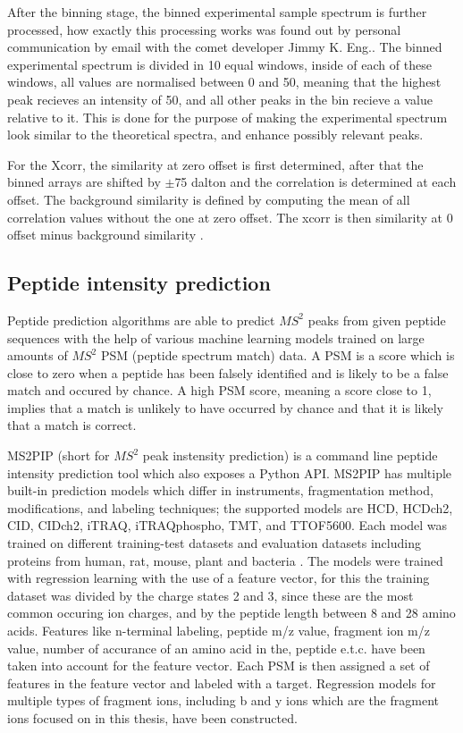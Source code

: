\documentclass[11pt]{article}
\begin{document}
After the binning stage, the binned experimental sample spectrum is further processed, how exactly this processing works was found out by personal communication by email with the comet developer Jimmy K. Eng.. The binned experimental spectrum is divided in 10 equal windows, inside of each of these windows, all values are normalised between 0 and 50, meaning that the highest peak recieves an intensity of 50, and all other peaks in the bin recieve a value relative to it. This is done for the purpose of making the experimental spectrum look similar to the theoretical spectra, and enhance possibly relevant peaks.

For the Xcorr, the similarity at zero offset is first determined, after that the binned arrays are shifted by $\pm$75 dalton and the correlation is determined at each offset. The background similarity is defined by computing the mean of all correlation values without the one at zero offset. The xcorr is then similarity at 0 offset minus background similarity \cite{xcorr-function}.

\subsection{Peptide intensity prediction}
Peptide prediction algorithms are able to predict \(MS^2\) peaks from given peptide sequences with the help of various machine learning models trained on large amounts of \(MS^2\) PSM (peptide spectrum match) data. A PSM is a score which is close to zero when a peptide has been falsely identified and is likely to be a false match and occured by chance. A high PSM score, meaning a score close to 1, implies that a match is unlikely to have occurred by chance and that it is likely that a match is correct. 

MS2PIP\cite{ms2pip, ms2pip-server} (short for \(MS^2\) peak instensity prediction) is a command line peptide intensity prediction tool which also exposes a Python API. MS2PIP has multiple built-in prediction models which differ in instruments, fragmentation method, modifications, and labeling techniques; the supported models are HCD, HCDch2, CID, CIDch2, iTRAQ, iTRAQphospho, TMT, and TTOF5600. Each model was trained on different training-test datasets and evaluation datasets including proteins from human, rat, mouse, plant and bacteria \cite{ms2pip}. The models were trained with regression learning with the use of a feature vector, for this the training dataset was divided by the charge states 2 and 3, since these are the most common occuring ion charges, and by the peptide length between 8 and 28 amino acids. Features like n-terminal labeling, peptide m/z value, fragment ion m/z value, number of accurance of an amino acid in the, peptide e.t.c. have been taken into account for the feature vector. Each PSM is then assigned a set of features in the feature vector and labeled with a target. Regression models for multiple types of fragment ions, including b and y ions which are the fragment ions focused on in this thesis, have been constructed.
\end{document}
